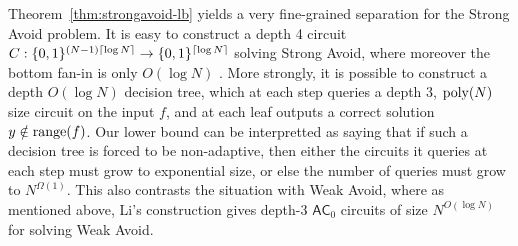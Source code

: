 
%



Theorem~\ref{thm:strongavoid-lb} yields a very fine-grained separation for the Strong Avoid problem. It is easy to construct a depth 4 circuit $C:\{0,1\}^{(N-1)\lceil \log N \rceil} \to \{0,1\}^{\lceil \log N \rceil}$ solving Strong Avoid, where moreover the bottom fan-in is only $O(\log N)$ \cite{vyas-williams}. More strongly, it is possible to construct a depth $O(\log N)$ decision tree, which at each step queries a depth 3, $\mathrm{poly}(N)$ size circuit on the input $f$, and at each leaf outputs a correct solution $y \notin \mathrm{range}(f)$. Our lower bound can be interpretted as saying that if such a decision tree is forced to be non-adaptive, then either the circuits it queries at each step must grow to exponential size, or else the number of queries must grow to $N^{\Omega(1)}$. This also contrasts the situation with Weak Avoid, where as mentioned above,  Li's construction gives depth-3 $\mathsf{AC}_0$ circuits of size $N^{O(\log N)}$ for solving Weak Avoid.


